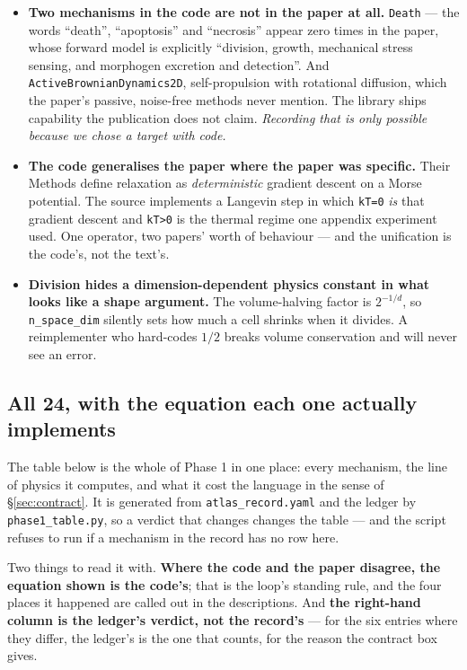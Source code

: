 \documentclass[11pt,a4paper]{article}
\newcommand{\code}[1]{\texttt{#1}}
\begin{document}
\begin{itemize}
\item \textbf{Two mechanisms in the code are not in the paper at all.} \code{Death} --- the words
``death'', ``apoptosis'' and ``necrosis'' appear zero times in the paper, whose forward model is
explicitly ``division, growth, mechanical stress sensing, and morphogen excretion and detection''.
And \code{ActiveBrownianDynamics2D}, self-propulsion with rotational diffusion, which the paper's
passive, noise-free methods never mention. The library ships capability the publication does not
claim. \emph{Recording that is only possible because we chose a target with code.}
\item \textbf{The code generalises the paper where the paper was specific.} Their Methods define
relaxation as \emph{deterministic} gradient descent on a Morse potential. The source implements a
Langevin step in which \code{kT=0} \emph{is} that gradient descent and \code{kT>0} is the thermal
regime one appendix experiment used. One operator, two papers' worth of behaviour --- and the
unification is the code's, not the text's.
\item \textbf{Division hides a dimension-dependent physics constant in what looks like a shape
argument.} The volume-halving factor is $2^{-1/d}$, so \code{n\_space\_dim} silently sets how much
a cell shrinks when it divides. A reimplementer who hard-codes $1/2$ breaks volume conservation
and will never see an error.
\end{itemize}

\subsection{All 24, with the equation each one actually implements}\label{sec:p1box}

The table below is the whole of Phase 1 in one place: every mechanism, the line of physics it
computes, and what it cost the language in the sense of \S\ref{sec:contract}. It is generated from
\code{atlas\_record.yaml} and the ledger by \code{phase1\_table.py}, so a verdict that changes
changes the table --- and the script refuses to run if a mechanism in the record has no row here.

Two things to read it with. \textbf{Where the code and the paper disagree, the equation shown is
the code's}; that is the loop's standing rule, and the four places it happened are called out in
the descriptions. And \textbf{the right-hand column is the ledger's verdict, not the record's} ---
for the six entries where they differ, the ledger's is the one that counts, for the reason the
contract box gives.
\end{document}
